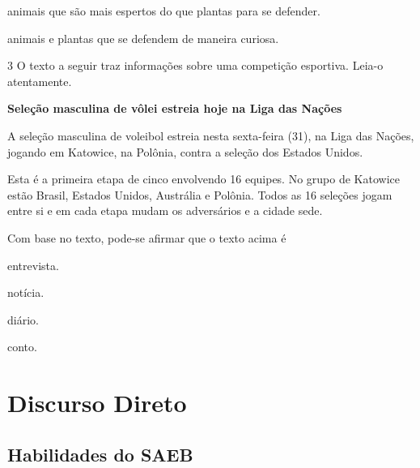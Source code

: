 \begin{conteudo}
\begin{conteudo}
\begin{conteudo}
\begin{conteudo}
\begin{escolha}
\item animais que são mais espertos do que plantas para se defender.

\item animais e plantas que se defendem de maneira curiosa.
\end{escolha}

\pagebreak
\num{3} O texto a seguir traz informações sobre uma competição esportiva. 
Leia-o atentamente.

\begin{myquote}
\textbf{Seleção masculina de vôlei estreia hoje na Liga das Nações}

A seleção masculina de voleibol estreia nesta sexta-feira
(31), na Liga das Nações, jogando em Katowice, na Polônia, contra a 
seleção dos Estados Unidos.

Esta é a primeira etapa de cinco envolvendo 16 equipes. No grupo de 
Katowice estão Brasil, Estados Unidos, Austrália e Polônia. Todos as 16
seleções jogam entre si e em cada etapa mudam os adversários e a cidade 
sede.

\end{myquote}

Com base no texto, pode-se afirmar que o texto
acima é 

\begin{escolha}
\item entrevista.

\item notícia.

\item diário.

\item conto.
\end{escolha}

\chapter{Discurso Direto}


\section*{Habilidades do SAEB}

\begin{itemize}


\end{itemize}
\end{conteudo}
\end{conteudo}
\end{conteudo}
\end{conteudo}
